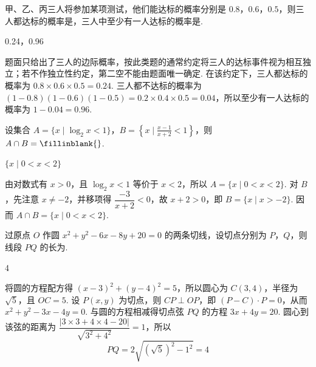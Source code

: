 \begin{problem}
甲、乙、丙三人将参加某项测试，他们能达标的概率分别是 \(0.8\)，\(0.6\)，\(0.5\)，则三人都达标的概率是\fillinblank{}，三人中至少有一人达标的概率是\fillinblank{}.
\end{problem}

\begin{answer}
0.24，0.96
\end{answer}

\begin{solution}
题面只给出了三人的边际概率，按此类题的通常约定将三人的达标事件视为相互独立；若不作独立性约定，第二空不能由题面唯一确定. 在该约定下，三人都达标的概率为 \(0.8\times0.6\times0.5=0.24\). 三人都不达标的概率为 \((1-0.8)(1-0.6)(1-0.5)=0.2\times0.4\times0.5=0.04\)，所以至少有一人达标的概率为 \(1-0.04=0.96\).
\end{solution}

\begin{problem}
设集合 \(A = \{x \mid \log_2 x < 1\}\)，\(B = \left\{x \mid \frac{x - 1}{x + 2} < 1\right\}\)，则 \(A \cap B=\fillinblank{}\).
\end{problem}

\begin{answer}
\(\{x \mid 0 < x < 2\}\)
\end{answer}

\begin{solution}
由对数式有 \(x>0\)，且 \(\log_2x<1\) 等价于 \(x<2\)，所以 \(A=\{x\mid0<x<2\}\). 对 \(B\)，先注意 \(x\neq-2\)，并移项得 \(\dfrac{-3}{x+2}<0\)，故 \(x+2>0\)，即 \(B=\{x\mid x>-2\}\). 因而 \(A\cap B=\{x\mid0<x<2\}\).
\end{solution}

\begin{problem}
过原点 \(O\) 作圆 \( x^{2} + y^{2} - 6x - 8y + 20 = 0 \) 的两条切线，设切点分别为 \(P\)，\(Q\)，则线段 \(PQ\) 的长为\fillinblank{}.
\end{problem}

\begin{answer}
4
\end{answer}

\begin{solution}
将圆的方程配方得 \((x-3)^2+(y-4)^2=5\)，所以圆心为 \(C(3,4)\)，半径为 \(\sqrt5\)，且 \(OC=5\). 设 \(P(x,y)\) 为切点，则 \(CP\perp OP\)，即 \((P-C)\cdot P=0\)，从而 \(x^2+y^2-3x-4y=0\). 与圆的方程相减得切点弦 \(PQ\) 的方程 \(3x+4y=20\). 圆心到该弦的距离为 \(\dfrac{|3\times3+4\times4-20|}{\sqrt{3^2+4^2}}=1\)，所以
\[
PQ=2\sqrt{(\sqrt5)^2-1^2}=4
\]
\end{solution}

